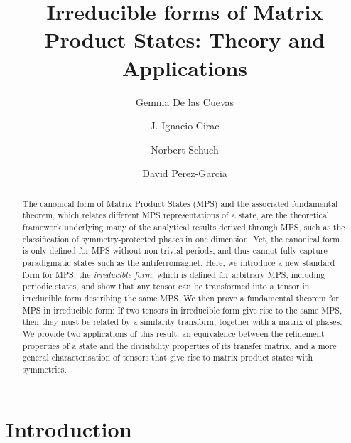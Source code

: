 \documentclass[pra,a4paper,notitlepage,nofootinbib,superscriptaddress]{revtex4-1}
\theoremstyle{plain}
\newcommand{\1}{{\openone}}
\begin{document}
\title{Irreducible forms of Matrix Product States: Theory and Applications}


\author{Gemma De las Cuevas}
\address{Institut f\"ur Theoretische Physik, Universit\"at Innsbruck,
    Technikerstr.\ 21a, 6020 Innsbruck, Austria}
\author{J. Ignacio Cirac}
\address{Max Planck Institute for Quantum Optics,
    Hans-Kopfermann-Str.\ 1, 85748 Garching, Germany}
\author{Norbert Schuch}
\address{Max Planck Institute for Quantum Optics,
    Hans-Kopfermann-Str.\ 1, 85748 Garching, Germany}
\author{David Perez-Garcia}
\address{Departamento de An\'alisis Matem\'atico and IMI,
    Universidad Complutense de Madrid, 28040 Madrid, Spain}
\address{ICMAT, C/ Nicol\'as Cabrera, Campus de Cantoblanco, 28049 Madrid,
    Spain}





\begin{abstract}
    The canonical form of Matrix Product States (MPS) and the associated
    fundamental theorem, which relates different MPS representations of a
    state, are the theoretical framework underlying many of the
    analytical results derived through MPS, such as the classification of
    symmetry-protected phases in one dimension.  Yet, the canonical form
    is only defined for MPS without non-trivial periods, and thus cannot fully
    capture paradigmatic states such as the antiferromagnet.  Here, we
    introduce a new standard form for MPS, the \emph{irreducible form}, which
    is defined for arbitrary MPS, including periodic states, and show that any
    tensor can be transformed into a tensor in irreducible form describing the
    same MPS. We then prove a fundamental theorem for MPS in irreducible form:
    If two tensors in irreducible form give rise to the same MPS, then they
    must be related by a similarity transform, together with a matrix of
    phases.
    We provide two applications of this result: an equivalence between
    the refinement properties of a state and the divisibility properties of
    its transfer matrix,  and a more general characterisation of tensors that
    give rise to matrix product states with symmetries.  \end{abstract}

\maketitle






\section{Introduction}
\label{sec:introduction}
\end{document}
